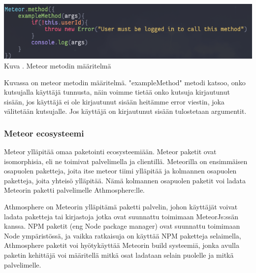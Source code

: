 \documentclass[11pt,a4paper,titlepage,oneside]{article}
\begin{document}
\includegraphics[width=15cm]{src/public/methodexample.png}\\
Kuva \getImgCount {}. Meteor metodin määritelmä
\medskip

Kuvassa on meteor metodin määritelmä. "exampleMethod"{} metodi katsoo, onko kutsujalla käyttäjä tunnusta, näin voimme tietää onko kutsuja kirjautunut sisään,
jos käyttäjä ei ole kirjautunut sisään heitämme error viestin, joka välitetään kutsujalle.
Jos käyttäjä on kirjautunut sisään tulostetaan argumentit. 

\medskip




\subsubsection{Meteor ecosysteemi}




Meteor ylläpitää omaa paketointi ecosysteemiään.
Meteor paketit ovat isomorphisia, eli ne toimivat palvelimella ja clientillä.
Meteorilla on ensimmäisen osapuolen paketteja, joita itse meteor tiimi ylläpitää ja kolmannen osapuolen paketteja,
joita yhteisö ylläpitää. Nämä kolmannen osapuolen paketit voi ladata Meteorin paketti palvelimelle Athmosphere:lle.
\medskip


Athmosphere on Meteorin ylläpitämä paketti palvelin, johon käyttäjät voivat ladata paketteja tai kirjastoja jotka ovat suunnattu toimimaan MeteorJs:ssän kanssa.
NPM paketit (eng Node package manager) ovat suunnattu toimimaan Node ympäristössä, ja vaikka ratkaisuja on käyttää NPM paketteja selaimella, 
Athmosphere paketit voi hyötykäyttää Meteorin build systeemiä, jonka avulla paketin kehittäjä voi määritellä mitkä osat ladataan selain puolelle ja mitkä palvelimelle.\citemissing
\end{document}
